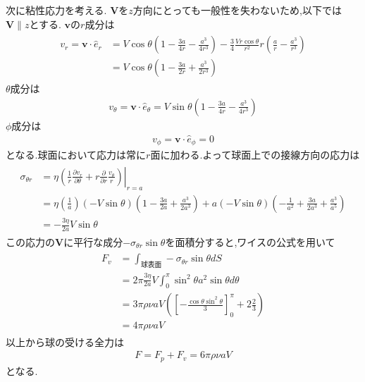 \documentclass[uplatex,a4j,11pt,dvipdfmx]{jsarticle}
\begin{document}
次に粘性応力を考える.
${\bm V}$を$z$方向にとっても一般性を失わないため,以下では${\bm V}\parallel z$とする.
$\bm v$の$r$成分は
\begin{align}
  \begin{split}
    v_r={\bm v}\cdot\hat{e}_r&=V\cos\theta\left(1-\frac{3a}{4r}-\frac{a^3}{4r^3}\right)-\frac{3}{4}\frac{Vr\cos\theta}{r^2}r\left(\frac{a}{r}-\frac{a^3}{r^3}\right)\\
    &=V\cos\theta\left(1-\frac{3a}{2r}+\frac{a^3}{2r^3}\right)
  \end{split}
\end{align}
$\theta$成分は
\begin{align}
  v_\theta={\bm v}\cdot\hat{e}_\theta=V\sin\theta\left(1-\frac{3a}{4r}-\frac{a^3}{4r^3}\right)
\end{align}
$\phi$成分は
\begin{align}
  v_\phi={\bm v}\cdot\hat{e}_\phi=0
\end{align}
となる.球面において応力は常に$r$面に加わる.よって球面上での接線方向の応力は
\begin{align}
  \begin{split}
    \sigma_{\theta r}&=\eta\left.\left(\frac{1}{r}\frac{\partial v_r}{\partial\theta}+r\frac{\partial}{\partial r}\frac{v_\theta}{r}\right)\right|_{r=a}\\
    &=\eta\left(\frac{1}{a}\right)(-V\sin\theta)\left(1-\frac{3a}{2a}+\frac{a^3}{2a^3}\right)+a(-V\sin\theta)\left(-\frac{1}{a^2}+\frac{3a}{2a^3}+\frac{a^3}{a^5}\right)\\
    &=-\frac{3\eta}{2a}V\sin\theta
  \end{split}
\end{align}
この応力の$\bm V$に平行な成分$-\sigma_{\theta r}\sin\theta$を面積分すると,ワイスの公式を用いて
\begin{align}
  \begin{split}
    F_v&=\int_{球表面}-\sigma_{\theta r}\sin\theta dS\\
    &=2\pi\frac{3\eta}{2a}V\int_0^\pi\sin^2\theta a^2\sin\theta d\theta\\
    &=3\pi\rho\nu aV\left(\left[-\frac{\cos\theta\sin^2\theta}{3}\right]_0^\pi+2\frac{2}{3}\right)\\
    &=4\pi\rho\nu aV
  \end{split}
\end{align}
以上から球の受ける全力は
\begin{align}
  F=F_p+F_v=6\pi\rho\nu aV
\end{align}
となる.\cite{sec8201073:online}

\end{document}
